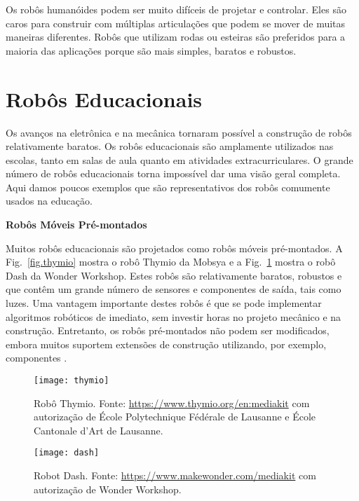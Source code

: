 Os robôs humanóides podem ser muito difíceis de projetar e controlar. Eles são caros para construir com múltiplas articulações que podem se mover de muitas maneiras diferentes. Robôs que utilizam rodas ou esteiras são preferidos para a maioria das aplicações porque são mais simples, baratos e robustos.

\section{Robôs Educacionais}\label{s.educational}

Os avanços na eletrônica e na mecânica tornaram possível a construção de robôs relativamente baratos. Os robôs educacionais são amplamente utilizados nas escolas, tanto em salas de aula quanto em atividades extracurriculares. O grande número de robôs educacionais torna impossível dar uma visão geral completa. Aqui damos poucos exemplos que são representativos dos robôs comumente usados na educação.

\smallskip

\noindent\textbf{Robôs Móveis Pré-montados}

Muitos robôs educacionais são projetados como robôs móveis pré-montados. A Fig.~\ref{fig.thymio} mostra o robô Thymio da Mobsya e a Fig.~\ref{fig.dash} mostra o robô Dash da Wonder Workshop. Estes robôs são relativamente baratos, robustos e que contêm um grande número de sensores e componentes de saída, tais como luzes. Uma vantagem importante destes robôs é que se pode implementar algoritmos robóticos de imediato, sem investir horas no projeto mecânico e na construção. Entretanto, os robôs pré-montados não podem ser modificados, embora muitos suportem extensões de construção utilizando, por exemplo, componentes \lego{}.

\begin{figure}
\begin{minipage}{.45\textwidth}
\begin{center}
\texttt{[image: thymio]}
\caption{Robô Thymio. Fonte: \protect\url{https://www.thymio.org/en:mediakit} com autorização  de \'{E}cole Polytechnique F\'{e}d\'{e}rale de Lausanne e \'{E}cole Cantonale d'Art de Lausanne.}\label{fig.thymio}
\end{center}
\end{minipage}
\hspace{\fill}
\begin{minipage}{.45\textwidth}
\begin{center}
\texttt{[image: dash]}
\caption{Robot Dash. Fonte: \protect\url{https://www.makewonder.com/mediakit} com autorização de Wonder Workshop.}\label{fig.dash}
\end{center}
\end{minipage}
\end{figure}

